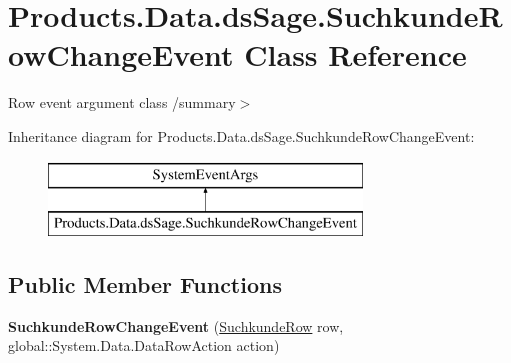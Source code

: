 \hypertarget{class_products_1_1_data_1_1ds_sage_1_1_suchkunde_row_change_event}{}\section{Products.\+Data.\+ds\+Sage.\+Suchkunde\+Row\+Change\+Event Class Reference}
\label{class_products_1_1_data_1_1ds_sage_1_1_suchkunde_row_change_event}


Row event argument class /summary$>$  


Inheritance diagram for Products.\+Data.\+ds\+Sage.\+Suchkunde\+Row\+Change\+Event\+:\begin{figure}[H]
\begin{center}
\leavevmode
\includegraphics[height=2.000000cm]{class_products_1_1_data_1_1ds_sage_1_1_suchkunde_row_change_event}
\end{center}
\end{figure}
\subsection*{Public Member Functions}
\begin{DoxyCompactItemize}
\item 
{\bfseries Suchkunde\+Row\+Change\+Event} (\hyperlink{class_products_1_1_data_1_1ds_sage_1_1_suchkunde_row}{Suchkunde\+Row} row, global\+::\+System.\+Data.\+Data\+Row\+Action action)\hypertarget{class_products_1_1_data_1_1ds_sage_1_1_suchkunde_row_change_event_a740a7db04b3bccc06173abe26ff5df60}{}\label{class_products_1_1_data_1_1ds_sage_1_1_suchkunde_row_change_event_a740a7db04b3bccc06173abe26ff5df60}

\end{DoxyCompactItemize}
